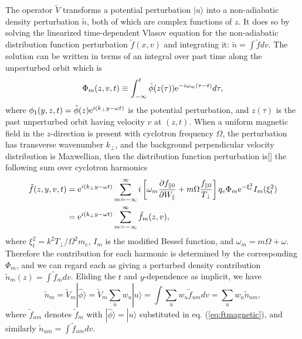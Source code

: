 \documentclass[12pt]{article}
\def\ket#1{|#1\rangle}
\begin{document}
The operator $\tilde{V}$ transforms a potential perturbation $\ket{u}$
into a non-adiabatic density perturbation $\tilde n$, both of which
are complex functions of $z$. It does so by solving the linearized
time-dependent Vlasov equation for the non-adiabatic distribution
function perturbation $\tilde f(x,v)$ and integrating it:
$\tilde n =\int \tilde f dv$. The solution can be written in terms of
an integral over past time along the unperturbed orbit which is
\begin{equation}
  \label{eq:phim}
  \Phi_m(z,v,t)\equiv 
  \int_{-\infty}^t \hat\phi(z(\tau)){\rm e}^{-i\omega_m(\tau-t)}d\tau,
\end{equation}
where $\phi_1(y,z,t)=\hat\phi(z){\rm e}^{i(k_\perp y-\omega t)}$ is the potential
perturbation, and $z(\tau)$ is the past unperturbed orbit having
velocity $v$ at $(z,t)$. When a uniform magnetic field in the
$z$-direction is present with cyclotron frequency $\Omega$, the
perturbation has transverse wavenumber $k_\perp$, and the background
perpendicular velocity distribution is Maxwellian, then the
distribution function perturbation is[] the following sum over cyclotron
harmonics
\begin{equation}\label{eq:ftmagnetic}
  \begin{split}
    \tilde f(z,y,v,t) &=  {\rm e}^{i(k_\perp y-\omega t)}
 \sum_{m=-\infty}^\infty i\left[\omega_m
  {\partial f_{\parallel0}\over \partial W_\parallel}
  +m\Omega {f_{\parallel0}\over T_\perp}\right]
  q_e\Phi_m {\rm e}^{-\xi_t^2}I_m(\xi_t^2)\\
  &= {\rm e}^{i(k_\perp y-\omega t)} \sum_{m=-\infty}^\infty \tilde f_m(z,v),
  \end{split}
\end{equation}
where $\xi_t^2=k^2T_\perp/\Omega^2m_e$, $I_m$ is the modified Bessel
function, and $\omega_m=m\Omega+\omega$. Therefore the contribution
for each harmonic is determined by the corresponding $\Phi_m$, and we
can regard each as giving a perturbed density contribution
$\tilde n_m(z)=\int \tilde f_m dv$. Eliding the $t$ and $y$-dependence
as implicit, we have
\begin{equation}
  \label{eq:13}
\tilde  n_m=\tilde{V}_{m}\ket{\hat\phi}=\tilde{V}_{m}\sum_u w_u\ket{u}=\int \sum_u w_u
  \tilde f_{um} dv=\sum_u w_u \tilde n_{um},
\end{equation}
where $\tilde f_{um}$ denotes $\tilde f_m$ with
$\ket{\hat\phi}=\ket{u}$ substituted in eq. (\ref{eq:ftmagnetic}), and
similarly $\tilde n_{um}=\int \tilde f_{um}dv$.
\end{document}
